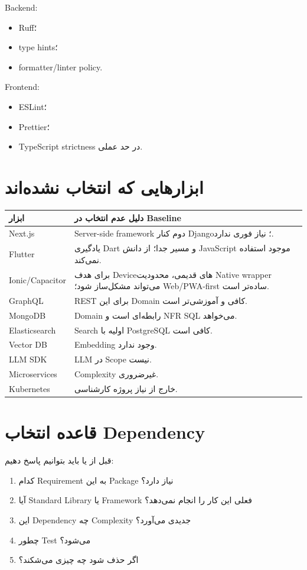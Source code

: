 Backend:
\begin{itemize}
  \item Ruff؛
  \item type hints؛
  \item formatter/linter policy.
\end{itemize}

Frontend:
\begin{itemize}
  \item ESLint؛
  \item Prettier؛
  \item TypeScript strictness در حد عملی.
\end{itemize}

\section{ابزارهایی که انتخاب نشده‌اند}

\begin{longtable}{p{4cm}p{9cm}}
\toprule
\textbf{ابزار} & \textbf{دلیل عدم انتخاب در Baseline} \\
\midrule
Next.js & Server-side framework دوم کنار Django؛ نیاز فوری ندارد. \\
Flutter & یادگیری Dart و مسیر جدا؛ از دانش JavaScript موجود استفاده نمی‌کند. \\
Ionic/Capacitor & برای هدف Deviceهای قدیمی، محدودیت Native wrapper می‌تواند مشکل‌ساز شود؛ Web/PWA-first ساده‌تر است. \\
GraphQL & REST برای این Domain کافی و آموزشی‌تر است. \\
MongoDB & Domain رابطه‌ای است و NFR SQL می‌خواهد. \\
Elasticsearch & Search اولیه با PostgreSQL کافی است. \\
Vector DB & Embedding وجود ندارد. \\
LLM SDK & LLM در Scope نیست. \\
Microservices & Complexity غیرضروری. \\
Kubernetes & خارج از نیاز پروژه کارشناسی. \\
\bottomrule
\end{longtable}

\section{قاعده انتخاب Dependency}

قبل از  یا  باید بتوانیم پاسخ دهیم:
\begin{enumerate}
  \item کدام Requirement به این Package نیاز دارد؟
  \item آیا Standard Library یا Framework فعلی این کار را انجام نمی‌دهد؟
  \item این Dependency چه Complexity جدیدی می‌آورد؟
  \item چطور Test می‌شود؟
  \item اگر حذف شود چه چیزی می‌شکند؟
\end{enumerate}
